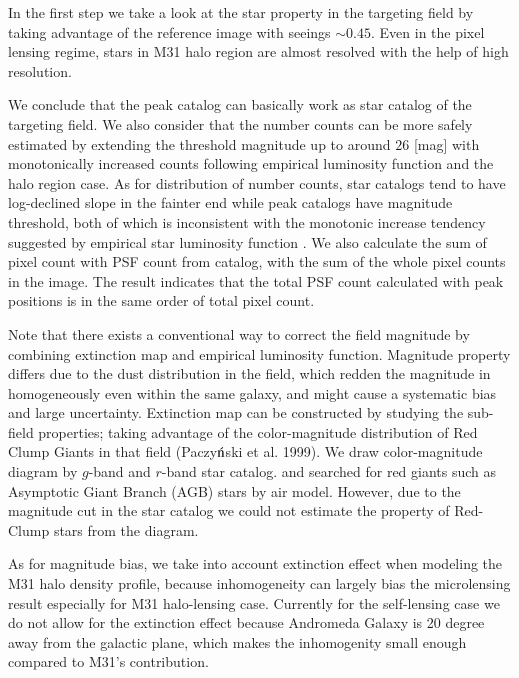 \documentclass[iop, apj]{emulateapj}
\newcommand{\?}{\stackrel{?}{=}}
\begin{document}
In the first step we take a look at the star property in the targeting field 
by taking advantage of the reference image with seeings $\sim 0.45$. 
Even in the pixel lensing regime, stars in M31 halo region are almost resolved 
with the help of high resolution.  


We conclude that the peak catalog can basically work as star catalog of the targeting field. We also consider that the number counts can be more safely estimated by extending the threshold magnitude up to around $26$ [mag] with monotonically increased counts following empirical luminosity function and the halo region case. 
As for distribution of number counts, star catalogs tend to have log-declined slope in the fainter end while peak catalogs have magnitude threshold, both of which is inconsistent with the monotonic increase tendency suggested by empirical star luminosity function \citep[ex.][]{MamonSoneira:82}. 
We also calculate the sum of pixel count with PSF count from catalog, with the sum of the whole pixel counts in the image. The result indicates that the total PSF count calculated with peak positions is in the same order of total pixel count. 

Note that there exists a conventional way to correct the field magnitude 
by combining extinction map and empirical luminosity function. 
Magnitude property differs due to the dust distribution in the field, 
which redden the magnitude in homogeneously even within the same galaxy, 
and might cause a systematic bias and large uncertainty. 
Extinction map can be constructed by studying the sub-field properties;  
taking advantage of the color-magnitude distribution 
of Red Clump Giants in that field (Paczy${\rm \acute{n}}$ski et al. 1999). 
We draw color-magnitude diagram by $g$-band and $r$-band star catalog. %
and searched for  red giants such as Asymptotic Giant Branch (AGB) stars 
by \citet{Kurucz:93} air model. 
However, due to the magnitude cut in the star catalog 
we could not estimate the property of Red-Clump stars from the diagram. 

As for magnitude bias, we take into account extinction effect 
when modeling the M31 halo density profile, because 
inhomogeneity can largely bias the microlensing result especially for M31 halo-lensing case. 
Currently for the self-lensing case we do not allow for the extinction effect 
because Andromeda Galaxy is 20 degree away from the galactic plane, 
which makes the inhomogenity small enough compared to M31's contribution.  
\end{document}
